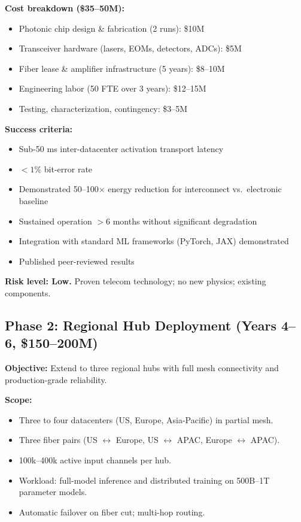 \documentclass[12pt]{article}
\begin{document}
\textbf{Cost breakdown (\$35--50M):}
\begin{itemize}[leftmargin=1.6em,itemsep=2pt]
  \item Photonic chip design \& fabrication (2 runs): \$10M
  \item Transceiver hardware (lasers, EOMs, detectors, ADCs): \$5M
  \item Fiber lease \& amplifier infrastructure (5 years): \$8--10M
  \item Engineering labor (50 FTE over 3 years): \$12--15M
  \item Testing, characterization, contingency: \$3--5M
\end{itemize}

\textbf{Success criteria:}
\begin{itemize}[leftmargin=1.6em,itemsep=2pt]
  \item Sub-50 ms inter-datacenter activation transport latency
  \item $<1\%$ bit-error rate
  \item Demonstrated 50--100$\times$ energy reduction for interconnect vs.\ electronic baseline
  \item Sustained operation $>6$ months without significant degradation
  \item Integration with standard ML frameworks (PyTorch, JAX) demonstrated
  \item Published peer-reviewed results
\end{itemize}

\textbf{Risk level: Low.} Proven telecom technology; no new physics; existing components.

\subsection{Phase 2: Regional Hub Deployment (Years 4--6, \$150--200M)}

\textbf{Objective:} Extend to three regional hubs with full mesh connectivity and
production-grade reliability.

\textbf{Scope:}
\begin{itemize}[leftmargin=1.6em,itemsep=2pt]
  \item Three to four datacenters (US, Europe, Asia-Pacific) in partial mesh.
  \item Three fiber pairs (US $\leftrightarrow$ Europe, US $\leftrightarrow$ APAC,
  Europe $\leftrightarrow$ APAC).
  \item 100k--400k active input channels per hub.
  \item Workload: full-model inference and distributed training on 500B--1T
  parameter models.
  \item Automatic failover on fiber cut; multi-hop routing.
\end{itemize}
\end{document}
